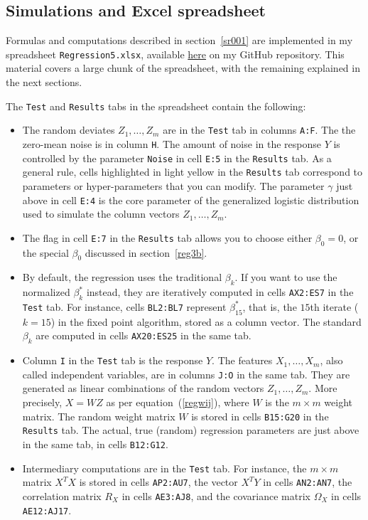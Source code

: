 \documentclass[oneside,10pt]{book}
\begin{document}
\subsection{Simulations and Excel spreadsheet}\label{rbbb}

Formulas and computations described in section~\ref{sr001} are implemented in my spreadsheet \texttt{Regression5.xlsx}, available \href{https://github.com/VincentGranville/Machine-Learning/blob/main/Spreadsheets/README.md}{here} on my GitHub repository. This material covers a large chunk of the spreadsheet, with the remaining explained in the next sections.

\noindent The \texttt{Test} and \texttt{Results} tabs in the spreadsheet contain the following:
\begin{itemize}
\item The random deviates $Z_1,\dots,Z_m$ are in the \texttt{Test} tab in columns \texttt{A:F}. The the zero-mean noise is in column \texttt{H}. The amount of noise in the response $Y$ is controlled by the parameter \texttt{Noise} in cell \texttt{E:5} in the \texttt{Results} tab. As a general rule, cells highlighted in light yellow 
in the \texttt{Results} tab correspond to parameters or hyper-parameters that you can modify. The parameter $\gamma$ just above in cell \texttt{E:4} is the core parameter of the generalized logistic distribution used to simulate the column vectors $Z_1,\dots,Z_m$.
\item The flag in cell \texttt{E:7} in the \texttt{Results} tab allows you to choose either $\beta_0=0$, or the special $\beta_0$ discussed in section~\ref{reg3b}.
\item  By default, the regression uses the traditional $\beta_k$. If you want to use the normalized $\beta^*_k$ instead, they are iteratively computed in cells \texttt{AX2:ES7} in the
\texttt{Test} tab. For instance, cells \texttt{BL2:BL7} represent $\beta_{15}^*$, that is, the $15$th iterate ($k=15$) in the fixed point algorithm, stored as a column vector. The standard $\beta_k$ are computed in cells \texttt{AX20:ES25} in the same tab.
\item Column \texttt{I} in the \texttt{Test} tab is the response $Y$. The features $X_1,\dots,X_m$, also called independent variables, are in columns \texttt{J:O} in the same tab. They are generated as linear combinations of the random vectors $Z_1,\dots,Z_m$. More precisely, $X=WZ$ as per equation~(\ref{regwij}), where
$W$ is the $m\times m$ weight matrix. The random weight matrix $W$ is stored in cells \texttt{B15:G20} in the \texttt{Results} tab. The actual, true (random) regression
parameters are just above in the same tab, in cells \texttt{B12:G12}.
\item Intermediary computations are in the \texttt{Test} tab. For instance, the $m\times m$ matrix $X^TX$ is stored in cells \texttt{AP2:AU7}, 
the vector $X^TY$ in cells  \texttt{AN2:AN7}, the correlation matrix $R_X$ in cells  \texttt{AE3:AJ8}, and the covariance matrix $\Omega_X$ in cells  \texttt{AE12:AJ17}.
\end{itemize} 
\end{document}
